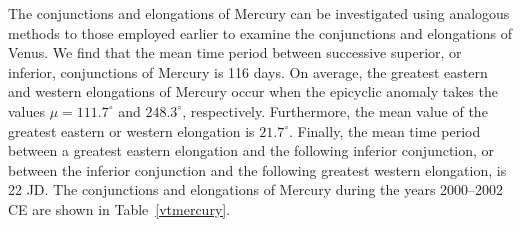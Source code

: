 The conjunctions  and elongations of Mercury can be investigated
using analogous methods to those employed earlier to examine the
conjunctions and elongations of Venus. We find that the mean
time period between successive superior, or inferior, conjunctions of
Mercury is 116 days. On average, the greatest eastern and
western elongations of Mercury occur when the epicyclic anomaly takes the
values $\mu=111.7^\circ$ and $248.3^\circ$, respectively. Furthermore,
the mean value of the greatest eastern or western elongation is $21.7^\circ$.
 Finally,
the mean time period between a greatest eastern elongation  and the following
inferior conjunction, or between the inferior conjunction and the following greatest western elongation, is 22 JD. The conjunctions and elongations of Mercury
during the years 2000--2002 CE are shown in Table~\ref{vtmercury}.

